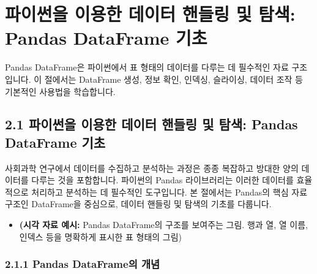 \documentclass[
  letterpaper,
]{book}
\providecommand{\tightlist}{%
  \setlength{\itemsep}{0pt}\setlength{\parskip}{0pt}}
\begin{document}
\chapter{파이썬을 이용한 데이터 핸들링 및 탐색: Pandas DataFrame
기초}\label{uxd30cuxc774uxc36cuxc744-uxc774uxc6a9uxd55c-uxb370uxc774uxd130-uxd578uxb4e4uxb9c1-uxbc0f-uxd0d0uxc0c9-pandas-dataframe-uxae30uxcd08}

\begin{tcolorbox}[enhanced jigsaw, left=2mm, colframe=quarto-callout-note-color-frame, coltitle=black, opacitybacktitle=0.6, rightrule=.15mm, colbacktitle=quarto-callout-note-color!10!white, arc=.35mm, colback=white, toptitle=1mm, breakable, titlerule=0mm, opacityback=0, title=\textcolor{quarto-callout-note-color}{\faInfo}\hspace{0.5em}{📌 핵심 요약}, bottomrule=.15mm, bottomtitle=1mm, leftrule=.75mm, toprule=.15mm]

Pandas DataFrame은 파이썬에서 표 형태의 데이터를 다루는 데 필수적인 자료
구조입니다. 이 절에서는 DataFrame 생성, 정보 확인, 인덱싱, 슬라이싱,
데이터 조작 등 기본적인 사용법을 학습합니다.

\end{tcolorbox}

\section{2.1 파이썬을 이용한 데이터 핸들링 및 탐색: Pandas DataFrame
기초}\label{uxd30cuxc774uxc36cuxc744-uxc774uxc6a9uxd55c-uxb370uxc774uxd130-uxd578uxb4e4uxb9c1-uxbc0f-uxd0d0uxc0c9-pandas-dataframe-uxae30uxcd08-1}

사회과학 연구에서 데이터를 수집하고 분석하는 과정은 종종 복잡하고 방대한
양의 데이터를 다루는 것을 포함합니다. 파이썬의 Pandas 라이브러리는
이러한 데이터를 효율적으로 처리하고 분석하는 데 필수적인 도구입니다. 본
절에서는 Pandas의 핵심 자료 구조인 DataFrame을 중심으로, 데이터 핸들링
및 탐색의 기초를 다룹니다.

\begin{itemize}
\tightlist
\item
  \textbf{(시각 자료 예시:} Pandas DataFrame의 구조를 보여주는 그림.
  행과 열, 열 이름, 인덱스 등을 명확하게 표시한 표 형태의 그림)
\end{itemize}

\subsection{2.1.1 Pandas DataFrame의
개념}\label{pandas-dataframeuxc758-uxac1cuxb150}
\end{document}
